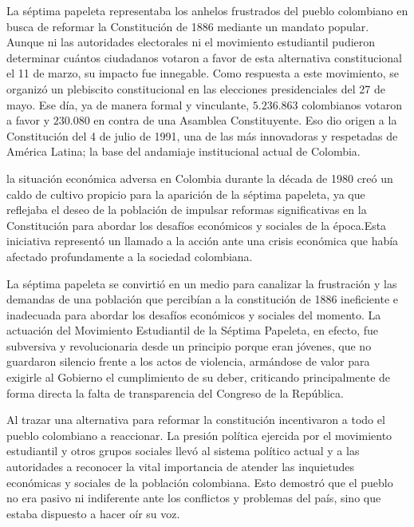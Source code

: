 \documentclass[letterpaper, 12pt]{article}
\begin{document}
La séptima papeleta representaba los anhelos frustrados del
pueblo colombiano en busca de reformar la Constitución de
1886 mediante un mandato popular. Aunque ni las autoridades
electorales ni el movimiento estudiantil pudieron
determinar cuántos ciudadanos votaron a favor de esta
alternativa constitucional el 11 de marzo, su impacto fue
innegable. Como respuesta a este movimiento, se organizó un
plebiscito constitucional en las elecciones presidenciales
del 27 de mayo. Ese día, ya de manera formal y vinculante,
$5.236.863$ colombianos votaron a favor y $230.080$ en
contra de una Asamblea Constituyente. Eso dio origen a la
Constitución del 4 de julio de 1991, una de las más
innovadoras y respetadas de América Latina; la base del
andamiaje institucional actual de Colombia.



la situación económica adversa en Colombia durante la
década de 1980 creó un caldo de cultivo propicio para la
aparición de la séptima papeleta, ya que reflejaba el deseo
de la población de impulsar reformas significativas en la
Constitución para abordar los desafíos económicos y
sociales de la época.Esta iniciativa representó un llamado
a la acción ante una crisis económica que había afectado
profundamente a la sociedad colombiana.

La séptima papeleta se convirtió en un medio para canalizar
la frustración y las demandas de una población que
percibían a la constitución de 1886 ineficiente e
inadecuada para abordar los desafíos económicos y sociales
del momento. La actuación del Movimiento Estudiantil de la
Séptima Papeleta, en efecto, fue subversiva y
revolucionaria desde un principio porque eran jóvenes, que
no guardaron silencio frente a los actos de violencia,
armándose de valor para exigirle al Gobierno el
cumplimiento de su deber, criticando principalmente de
forma directa la falta de transparencia del Congreso de la
República.

Al trazar una alternativa para reformar la constitución
incentivaron a todo el pueblo colombiano a reaccionar. La
presión política ejercida por el movimiento estudiantil y
otros grupos sociales llevó al sistema político actual y a
las autoridades a reconocer la vital importancia de atender
las inquietudes económicas y sociales de la población
colombiana. Esto demostró que el pueblo no era pasivo ni
indiferente ante los conflictos y problemas del país, sino
que estaba dispuesto a hacer oír su voz.

\nocite{Héctor}
\nocite{crisispolitica} \nocite{Carrero}

\printbibliography
\end{document}
